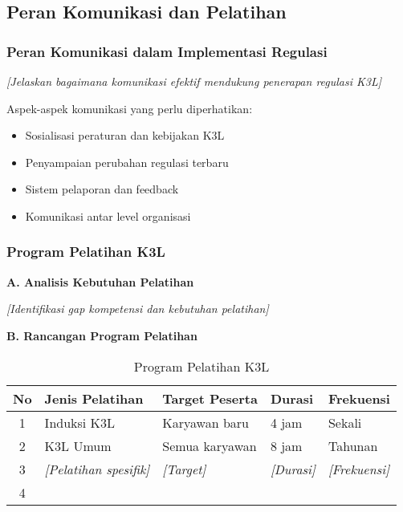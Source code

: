 \vspace{1cm}

\subsection{Peran Komunikasi dan Pelatihan}
\label{subsec:komunikasi-pelatihan}


\subsubsection{Peran Komunikasi dalam Implementasi Regulasi}

\textit{[Jelaskan bagaimana komunikasi efektif mendukung penerapan regulasi K3L]}

Aspek-aspek komunikasi yang perlu diperhatikan:
\begin{itemize}
    \item Sosialisasi peraturan dan kebijakan K3L
    \item Penyampaian perubahan regulasi terbaru
    \item Sistem pelaporan dan feedback
    \item Komunikasi antar level organisasi
\end{itemize}

\vspace{0.5cm}

\subsubsection{Program Pelatihan K3L}

\textbf{A. Analisis Kebutuhan Pelatihan}

\textit{[Identifikasi gap kompetensi dan kebutuhan pelatihan]}

\vspace{0.3cm}

\textbf{B. Rancangan Program Pelatihan}

\begin{table}[h]
\centering
\small
\begin{tabular}{|c|p{4cm}|p{3cm}|p{2cm}|p{2cm}|}
\hline
\textbf{No} & \textbf{Jenis Pelatihan} & \textbf{Target Peserta} & \textbf{Durasi} & \textbf{Frekuensi} \\
\hline
1 & Induksi K3L & Karyawan baru & 4 jam & Sekali \\
\hline
2 & K3L Umum & Semua karyawan & 8 jam & Tahunan \\
\hline
3 & \textit{[Pelatihan spesifik]} & \textit{[Target]} & \textit{[Durasi]} & \textit{[Frekuensi]} \\
\hline
4 & & & & \\
\hline
\end{tabular}
\caption{Program Pelatihan K3L}
\label{tab:program-pelatihan}
\end{table}

